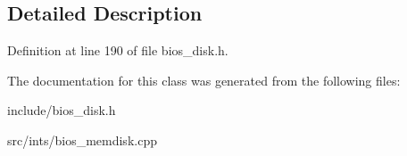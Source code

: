 \subsection{Detailed Description}


Definition at line 190 of file bios\-\_\-disk.\-h.



The documentation for this class was generated from the following files\-:\begin{DoxyCompactItemize}
\item 
include/bios\-\_\-disk.\-h\item 
src/ints/bios\-\_\-memdisk.\-cpp\end{DoxyCompactItemize}
